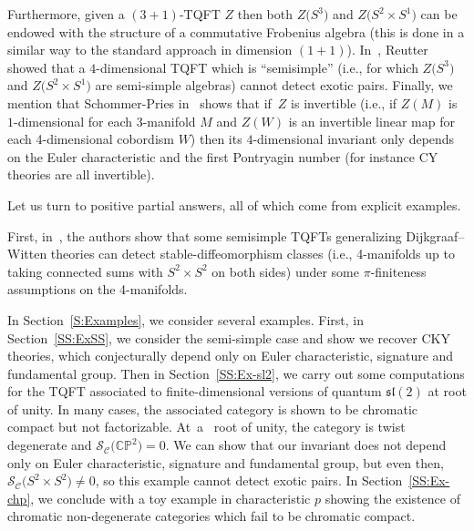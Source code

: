 \documentclass[10pt,a4paper]{amsart}
\numberwithin{equation}{section}
\numberwithin{theorem}{section}
\numberwithin{proposition}{section}
\numberwithin{definition}{section}
\numberwithin{lemma}{section}
\numberwithin{corollary}{section}
\numberwithin{remark}{section}
\numberwithin{example}{section}
\newcommand{\cat}{\mathcal{C}}
\newcommand{\slt}{\ensuremath{\mathfrak{sl}(2)}}
\newcommand{\CP}{\mathbb{CP}}
\newcommand{\TSkein}{{\mathscr{S}}}
\newcounter{exo} \newcounter{numexercice}
\begin{document}
Furthermore, given a $(3+1)$-TQFT $Z$ then both $Z\bigl(S^3\bigr)$ and $Z\bigl(S^2\times S^1\bigr)$ can be endowed with the structure of a commutative Frobenius algebra (this is done in a similar way to the standard approach in dimension $(1+1)$).
In~\cite{Reutter}, Reutter showed that a $4$-dimensional TQFT which is ``semisimple'' (i.e., for which $Z\bigl(S^3\bigr)$ and $Z\bigl(S^2\times S^1\bigr)$ are semi-simple algebras) cannot detect exotic pairs.
Finally, we mention that Schommer-Pries in~\cite[Theorem~7.6]{SP} shows that if~$Z$ is invertible (i.e.,
if
 $Z(M)$ is $1$-dimensional for each $3$-manifold $M$ and $Z(W)$ is an invertible linear map for each 4-dimensional cobordism $W$) then its $4$-dimensional invariant only depends on the Euler characteristic and the first Pontryagin number (for instance CY theories are all invertible).

Let us turn to positive partial answers, all of which come from explicit examples.

First, in~\cite{ReutterSP}, the authors show that some semisimple TQFTs generalizing Dijkgraaf--Witten theories can detect stable-diffeomorphism classes \big(i.e., 4-manifolds up to taking connected sums with $S^2\times S^2$ on both sides\big) under some $\pi$-finiteness assumptions on the 4-manifolds.

In Section~\ref{S:Examples}, we consider several examples. First, in Section~\ref{SS:ExSS}, we consider the semi-simple case and show we recover CKY theories, which conjecturally depend only on Euler characteristic, signature and fundamental group.
Then in Section~\ref{SS:Ex-sl2}, we
carry out some computations
for the TQFT associated to finite-dimensional versions of quantum $\slt$ at root of unity. In many
cases, the associated category is shown to be chromatic compact but not
factorizable. At~a~ root of unity, the category is twist
degenerate and $\TSkein_\cat\bigl(\CP^2\bigr)=0$. We can show that our invariant does not depend only on Euler characteristic, signature and fundamental group, but even then, ${\TSkein_\cat\bigl(S^2\times S^2\bigr)\neq 0}$, so this example cannot detect
exotic pairs.
In Section~\ref{SS:Ex-chp}, we conclude with a toy example
in characteristic $p$ showing the existence of chromatic
non-degenerate categories which fail to be chromatic compact.
\end{document}
